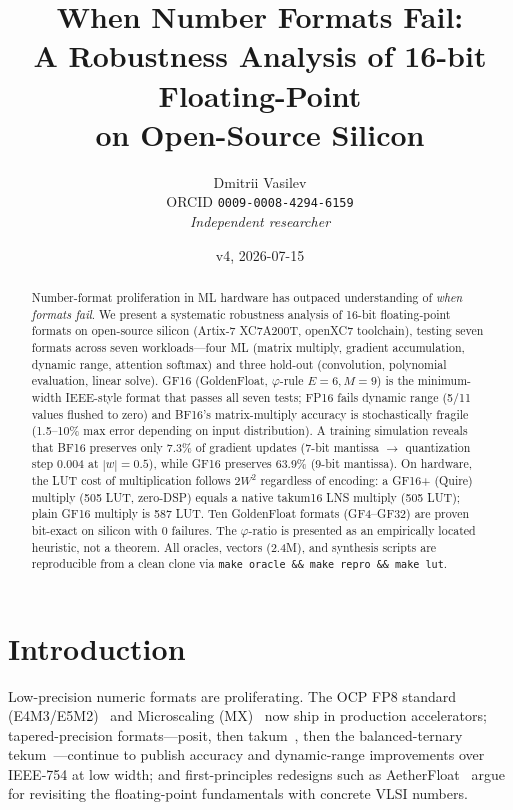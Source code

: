\documentclass[11pt]{article}
\title{When Number Formats Fail: \\
       A Robustness Analysis of 16-bit Floating-Point \\
       on Open-Source Silicon}
\author{Dmitrii Vasilev\\
        \small ORCID \texttt{0009-0008-4294-6159}\\
        \small \textit{Independent researcher}}
\date{v4, 2026-07-15}
\begin{document}
\maketitle

\begin{abstract}
Number-format proliferation in ML hardware has outpaced understanding of
\emph{when formats fail}. We present a systematic robustness
analysis of 16-bit floating-point formats on open-source silicon
(Artix-7 XC7A200T, openXC7 toolchain), testing seven formats across
seven workloads---four ML (matrix multiply, gradient accumulation,
dynamic range, attention softmax) and three hold-out (convolution,
polynomial evaluation, linear solve). GF16 (GoldenFloat, $\varphi$-rule
$E{=}6, M{=}9$) is the minimum-width IEEE-style format that passes all
seven tests; FP16 fails dynamic range (5/11 values flushed to zero) and
BF16's matrix-multiply accuracy is stochastically fragile (1.5--10\% max error
depending on input distribution). A training
simulation reveals that BF16 preserves only 7.3\% of gradient updates
(7-bit mantissa $\to$ quantization step 0.004 at $|w|{=}0.5$), while
GF16 preserves 63.9\% (9-bit mantissa). On hardware, the LUT cost of
multiplication follows $2W^2$ regardless of encoding: a GF16+ (Quire) multiply
(505 LUT, zero-DSP) equals a native takum16 LNS multiply (505 LUT); plain GF16
multiply is 587 LUT.
Ten GoldenFloat formats (GF4--GF32) are proven bit-exact on silicon
with 0 failures. The $\varphi$-ratio is presented as an empirically
located heuristic, not a theorem. All oracles, vectors (2.4M), and
synthesis scripts are reproducible from a clean clone via
\texttt{make oracle \&\& make repro \&\& make lut}.
\end{abstract}

\section{Introduction}\label{sec:intro}

Low-precision numeric formats are proliferating. The OCP FP8 standard
(E4M3/E5M2)~\cite{micikevicius2022fp8} and Microscaling
(MX)~\cite{rouhani2023mx} now ship in production accelerators; tapered-precision
formats---posit, then takum~\cite{hunhold2024takum}, then the balanced-ternary
tekum~\cite{hunhold2025tekum}---continue to publish accuracy and dynamic-range
improvements over IEEE-754 at low width; and first-principles redesigns such as
AetherFloat~\cite{morisaki2026aetherfloat} argue for revisiting the
floating-point fundamentals with concrete VLSI numbers.
\end{document}
